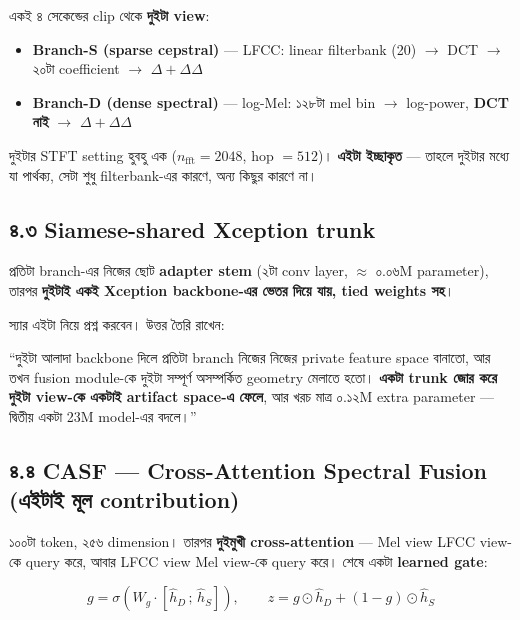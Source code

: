 \documentclass[11pt,a4paper]{article}
\newenvironment{say}{%
  \def\FrameCommand{\textcolor{barcol}{\vrule width 3pt}\hspace{8pt}}%
  \MakeFramed{\advance\hsize-\width \FrameRestore}%
}{\endMakeFramed}
\begin{document}
একই ৪ সেকেন্ডের clip থেকে \textbf{দুইটা view}:

\begin{itemize}
\item \textbf{Branch-S (sparse cepstral)} --- LFCC: linear filterbank (20)
      $\rightarrow$ DCT $\rightarrow$ ২০টা coefficient $\rightarrow$
      $\Delta + \Delta\Delta$
\item \textbf{Branch-D (dense spectral)} --- log-Mel: ১২৮টা mel bin
      $\rightarrow$ log-power, \textbf{DCT নাই} $\rightarrow$
      $\Delta + \Delta\Delta$
\end{itemize}

দুইটার STFT setting হুবহু এক ($n_\mathrm{fft} = 2048$, hop $= 512$)।
\textbf{এইটা ইচ্ছাকৃত} --- তাহলে দুইটার মধ্যে যা পার্থক্য, সেটা শুধু
filterbank-এর কারণে, অন্য কিছুর কারণে না।

\subsection*{৪.৩ Siamese-shared Xception trunk}

প্রতিটা branch-এর নিজের ছোট \textbf{adapter stem} (২টা conv layer,
$\approx$ ০.০৬M parameter), তারপর \textbf{দুইটাই একই Xception backbone-এর ভেতর
দিয়ে যায়, tied weights সহ}।

স্যার এইটা নিয়ে প্রশ্ন করবেন। উত্তর তৈরি রাখেন:

\begin{say}
``দুইটা আলাদা backbone দিলে প্রতিটা branch নিজের নিজের private feature space
বানাতো, আর তখন fusion module-কে দুইটা সম্পূর্ণ অসম্পর্কিত geometry মেলাতে হতো।
\textbf{একটা trunk জোর করে দুইটা view-কে একটাই artifact space-এ ফেলে}, আর খরচ
মাত্র ০.১২M extra parameter --- দ্বিতীয় একটা 23M model-এর বদলে।''
\end{say}

\subsection*{৪.৪ CASF --- Cross-Attention Spectral Fusion (এইটাই মূল contribution)}

১০০টা token, ২৫৬ dimension। তারপর \textbf{দুইমুখী cross-attention} --- Mel view
LFCC view-কে query করে, আবার LFCC view Mel view-কে query করে। শেষে একটা
\textbf{learned gate}:

\begin{equation*}
g = \sigma\!\left(W_g \cdot [\hat{h}_D \,;\, \hat{h}_S]\right),
\qquad
z = g \odot \hat{h}_D + (1 - g) \odot \hat{h}_S
\end{equation*}
\end{document}
